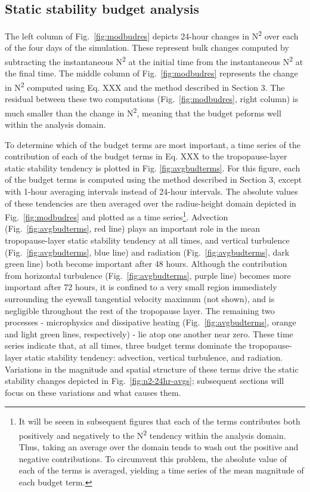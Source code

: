 \documentclass{ametsoc}
\begin{document}
 \subsection{Static stability budget analysis}

The left column of Fig.~\ref{fig:modbudres} depicts 24-hour changes in N\textsuperscript{2} over each of the four days of the simulation. 
These represent bulk changes computed by subtracting the instantaneous N\textsuperscript{2} at the initial time from the instantaneous N\textsuperscript{2} at the final time. 
The middle column of Fig.~\ref{fig:modbudres} represents the change in N\textsuperscript{2} computed using Eq. XXX and the method described in Section 3. 
The residual between these two computations (Fig.~\ref{fig:modbudres}, right column) is much smaller than the change in N\textsuperscript{2}, meaning that the budget peforms well within the analysis domain.

To determine which of the budget terms are most important, a time series of the contribution of each of the budget terms in Eq. XXX to the tropopause-layer static stability tendency is plotted in Fig. \ref{fig:avgbudterms}.
For this figure, each of the budget terms is computed using the method described in Section 3, except with 1-hour averaging intervals instead of 24-hour intervals.
The absolute values of these tendencies are then averaged over the radius-height domain depicted in Fig.~\ref{fig:modbudres} and plotted as a time series\footnote{It will be seeen in subsequent figures that each of the terms contributes both positively and negatively to the N\textsuperscript{2} tendency within the analysis domain. 
Thus, taking an average over the domain tends to wash out the positive and negative contributions.
To circumvent this problem, the absolute value of each of the terms is averaged, yielding a time series of the mean magnitude of each budget term.}. 
Advection (Fig.~\ref{fig:avgbudterms}, red line) plays an important role in the mean tropopause-layer static stability tendency at all times, and vertical turbulence (Fig.~\ref{fig:avgbudterms}, blue line) and radiation (Fig.~\ref{fig:avgbudterms}, dark green line) both become important after 48 hours.
Although the contribution from horizontal turbulence (Fig.~\ref{fig:avgbudterms}, purple line) becomes more important after 72 hours, it is confined to a very small region immediately surrounding the eyewall tangential velocity maximum (not shown), and is negligible throughout the rest of the tropopause layer.
The remaining two processes - microphysics and dissipative heating (Fig.~\ref{fig:avgbudterms}, orange and light green lines, respectively) - lie atop one another near zero.
These time series indicate that, at all times, three budget terms dominate the tropopause-layer static stability tendency: advection, vertical turbulence, and radiation.
Variations in the magnitude and spatial structure of these terms drive the static stability changes depicted in Fig.~\ref{fig:n2-24hr-avgs}; subsequent sections will focus on these variations and what causes them.
\end{document}

